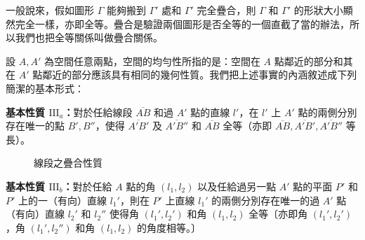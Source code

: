一般說來，假如圖形 $\varGamma$ 能夠搬到 $\varGamma'$ 處和 $\varGamma'$ 完全疊合，則 $\varGamma$ 和 $\varGamma'$ 的形狀大小顯然完全一樣，亦即全等。疊合是驗證兩個圖形是否全等的一個直截了當的辦法，所以我們也把全等關係叫做疊合關係。

設 $A, A'$ 為空間任意兩點，空間的均勻性所指的是：空間在 $A$ 點鄰近的部分和其在 $A'$ 點鄰近的部分應該具有相同的幾何性質。我們把上述事實的內涵敘述成下列簡潔的基本形式：

\noindent\textbf{基本性質 $\mathrm{III}_a$：}對於任給線段 $\overline{AB}$ 和過 $A'$ 點的直線 $l'$，在 $l'$ 上 $A'$ 點的兩側分別存在唯一的點 $B', B''$，使得 $\overline{A'B'}$ 及 $\overline{A'B''}$ 和 $\overline{AB}$ 全等（亦即 $\overline{AB}, \overline{A'B'}, \overline{A'B''}$ 等長）。

\begin{figure}[H]
\centering
{}
\caption{線段之疊合性質}
\label{fig:b3s-a1-14}
\end{figure}

\noindent\textbf{基本性質 $\mathrm{III}_b$：}對於任給 $A$ 點的角 $(l_1, l_2)$ 以及任給過另一點 $A'$ 點的平面 $P'$ 和 $P'$ 上的一（有向）直線 $l_1'$，則在 $P'$ 上直線 $l_1'$ 的兩側分別存在唯一的過 $A'$ 點（有向）直線 $l_2'$ 和 $l_2''$ 使得角 $(l_1', l_2')$ 和角 $(l_1, l_2)$ 全等〔亦即角 $(l_1', l_2')$，角 $(l_1', l_2'')$ 和角 $(l_1, l_2)$ 的角度相等。〕

